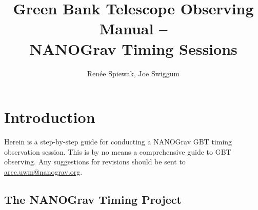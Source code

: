 \documentclass[11pt, reqno, tbtags]{article}
\begin{document}
\title{Green Bank Telescope Observing Manual -- \\
 NANOGrav Timing Sessions}
\author{Ren\'ee Spiewak, Joe Swiggum}


\maketitle 
{}
\tableofcontents


\section{Introduction}  %
Herein is a step-by-step guide for conducting a NANOGrav GBT timing observation session. This is by no means a comprehensive guide to GBT observing.  Any suggestions for revisions should be sent to \href{mailto:arcc.uwm@nanograv.org}{arcc.uwm@nanograv.org}.  

\subsection{The NANOGrav Timing Project} %
\end{document}
